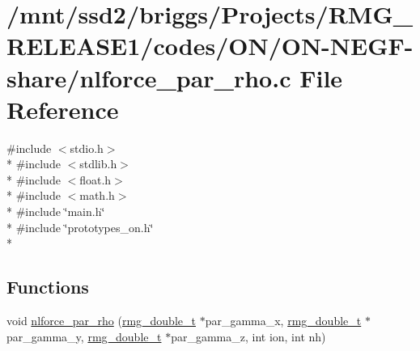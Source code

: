 \hypertarget{_o_n_2_o_n-_n_e_g_f-share_2nlforce__par__rho_8c}{\section{/mnt/ssd2/briggs/\-Projects/\-R\-M\-G\-\_\-\-R\-E\-L\-E\-A\-S\-E1/codes/\-O\-N/\-O\-N-\/\-N\-E\-G\-F-\/share/nlforce\-\_\-par\-\_\-rho.c File Reference}
\label{_o_n_2_o_n-_n_e_g_f-share_2nlforce__par__rho_8c}
}
{\ttfamily \#include $<$stdio.\-h$>$}\\*
{\ttfamily \#include $<$stdlib.\-h$>$}\\*
{\ttfamily \#include $<$float.\-h$>$}\\*
{\ttfamily \#include $<$math.\-h$>$}\\*
{\ttfamily \#include \char`\"{}main.\-h\char`\"{}}\\*
{\ttfamily \#include \char`\"{}prototypes\-\_\-on.\-h\char`\"{}}\\*
\subsection*{Functions}
\begin{DoxyCompactItemize}
\item 
void \hyperlink{_o_n_2_o_n-_n_e_g_f-share_2nlforce__par__rho_8c_aec4789aa9e822a0455514dc7a0e75692}{nlforce\-\_\-par\-\_\-rho} (\hyperlink{rmgtypes_8h_aaa16921c14f121c56eaa42390a340db8}{rmg\-\_\-double\-\_\-t} $\ast$par\-\_\-gamma\-\_\-x, \hyperlink{rmgtypes_8h_aaa16921c14f121c56eaa42390a340db8}{rmg\-\_\-double\-\_\-t} $\ast$par\-\_\-gamma\-\_\-y, \hyperlink{rmgtypes_8h_aaa16921c14f121c56eaa42390a340db8}{rmg\-\_\-double\-\_\-t} $\ast$par\-\_\-gamma\-\_\-z, int ion, int nh)
\end{DoxyCompactItemize}


